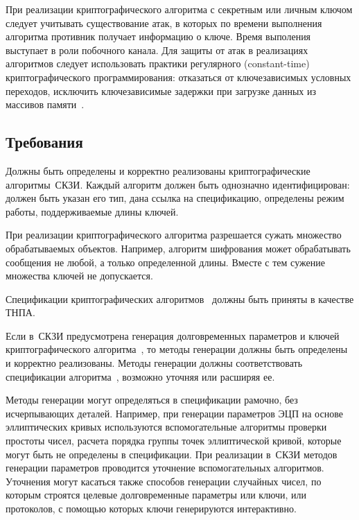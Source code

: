 При реализации криптографического алгоритма с секретным или личным ключом 
следует учитывать существование атак, в которых по времени выполнения алгоритма
противник получает информацию о ключе. Время выполения выступает в роли 
побочного канала.
%
Для защиты от атак в реализациях алгоритмов следует использовать практики 
регулярного (constant-time) криптографического программирования: отказаться от 
ключезависимых условных переходов, исключить ключезависимые задержки при 
загрузке данных из массивов памяти~.

\subsection{Требования}\label{CS.Reqs}

\label{R.CS.Algs}
Должны быть определены и корректно реализованы криптографические алгоритмы~СКЗИ. 
%
Каждый алгоритм должен быть однозначно идентифицирован: должен быть указан его
тип, дана ссылка на спецификацию, определены режим работы, поддерживаемые длины
ключей.

\begin{note}
При реализации криптографического алгоритма разрешается сужать множество
обрабатываемых объектов. Например, алгоритм шифрования может обрабатывать
сообщения не любой, а только определенной длины. Вместе с тем сужение множества
ключей не допускается.
\end{note}

\label{R.CS.Std}
Спецификации криптографических алгоритмов~
должны быть приняты в качестве ТНПА.

\label{R.CS.Gen}
Если в~СКЗИ предусмотрена генерация долговременных параметров и ключей 
криптографического алгоритма~, то методы генерации 
должны быть определены и корректно реализованы.
%
Методы генерации должны соответствовать спецификации
алгоритма~, возможно уточняя или расширяя ее.

\begin{note}
Методы генерации могут определяться в спецификации рамочно, без исчерпывающих 
деталей.
%
Например, при генерации параметров ЭЦП на основе эллиптических кривых
используются вспомогательные алгоритмы проверки простоты чисел, расчета порядка
группы точек эллиптической кривой, которые могут быть не определены в спецификации.
%
При реализации в~СКЗИ методов генерации параметров проводится уточнение 
вспомогательных алгоритмов.
%
Уточнения могут касаться также способов генерации случайных чисел,
по которым строятся целевые долговременные параметры или ключи,
или протоколов, с помощью которых ключи генерируются интерактивно.
\end{note}

